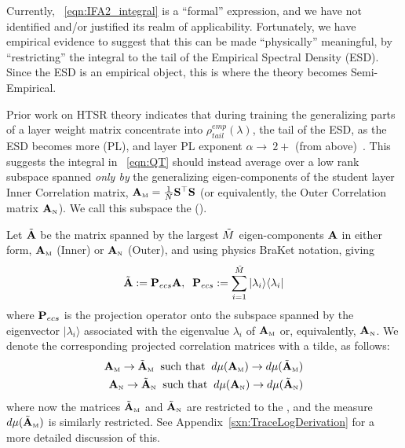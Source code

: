 Currently, \EQN~\ref{eqn:IFA2_integral} is a ``formal'' expression, 
and we have not identified and/or justified its realm of applicability.
Fortunately, we have empirical evidence to suggest that this can be
made ``physically'' meaningful, by ``restricting'' the integral
to the tail of the Empirical Spectral Density (ESD). Since the ESD is an empirical object, this is where the theory becomes Semi-Empirical.

Prior work on HTSR theory indicates that during training the generalizing parts of a layer weight matrix concentrate
into $\rho_{tail}^{emp}(\lambda)$, the tail of the ESD, as the ESD becomes more \PowerLaw (PL),
and layer PL exponent  $\alpha\rightarrow\ 2+$ (from above)~\cite{MM19_HTSR_ICML,MM20_SDM,MM18_TR_JMLRversion,MM20a_trends_NatComm,YTHx23_KDD}. 
This suggests the integral in \EQN~\ref{eqn:QT}
should instead average over a low rank subspace spanned \emph{only by} the generalizing eigen-components of the
student layer Inner Correlation matrix, ${\mathbf{A}}_{\text{\tiny M}}=\tfrac{1}{N}{\mathbf{S}}^{\top}{\mathbf{S}}$
(or equivalently, the Outer Correlation matrix ${\mathbf{A}}_{\text{\tiny N}}$).
We call this subspace the \EffectiveCorrelationSpace (\ECS).

Let $\tilde{\mathbf{A}}$ be the matrix spanned by the largest $\tilde{M}$ eigen-components $\mathbf{A}$
in either form, ${\mathbf{A}}_{\text{\tiny M}}$ (Inner) or ${\mathbf{A}}_{\text{\tiny N}}$ (Outer), and using physics BraKet notation, giving
\begin{align}
  \label{sqn:AecsDefined}
  \tilde{\mathbf{A}}:=\mathbf{P}_{ecs}\mathbf{A},\;\;  \mathbf{P}_{ecs}:= \sum_{i=1}^{\tilde{M}}|\lambda_{i}\rangle\langle\lambda_{i}|
\end{align}
where $\mathbf{P}_{ecs}$ is the projection operator onto the subspace spanned by the eigenvector
$|\lambda_{i}\rangle$  associated with the eigenvalue $\lambda_{i}$ of ${\mathbf{A}}_{\text{\tiny M}}$ or, equivalently, ${\mathbf{A}}_{\text{\tiny N}}$.
We denote the corresponding projected \Student correlation matrices with a tilde, as follows:
\begin{align}
  {\mathbf{A}}_{\text{\tiny M}} \rightarrow \tilde{\mathbf{A}}_{\text{\tiny M}}\;\; \text{such that}\;\; d\mu({\mathbf{A}}_{\text{\tiny M}}) \rightarrow d\mu(\tilde{\mathbf{A}}_{\text{\tiny M}}) \\ \nonumber
  {\mathbf{A}}_{\text{\tiny N}} \rightarrow \tilde{\mathbf{A}}_{\text{\tiny N}}\;\; \text{such that}\;\; d\mu({\mathbf{A}}_{\text{\tiny N}}) \rightarrow d\mu(\tilde{\mathbf{A}}_{\text{\tiny N}})  \nonumber
\end{align}
where now the matrices $\tilde{\mathbf{A}}_{\text{\tiny M}}$ and $\tilde{\mathbf{A}}_{\text{\tiny N}}$ are restricted to the \ECS, and the measure $d\mu(\tilde{\mathbf{A}}_{\text{\tiny M}})$ is similarly restricted.
 See Appendix~\ref{sxn:TraceLogDerivation} for a more detailed discussion of this.
   
